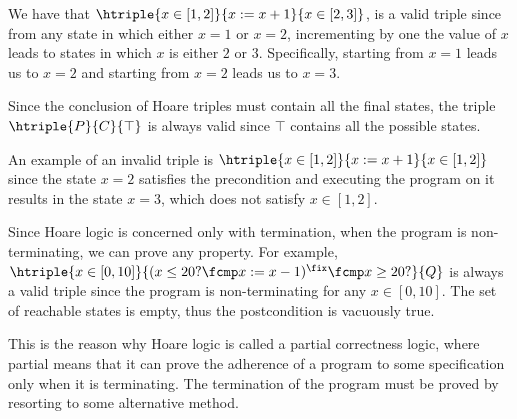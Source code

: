 \begin{example}
  \label{exmp:hlogic}
We have that $\htriple{x \in [1, 2]}{x := x + 1}{x \in [2, 3]}$, is a
valid triple since from any state in which either $x = 1$ or $x = 2$,
incrementing by one the value of $x$ leads to states in which $x$ is either $2$
or $3$. Specifically, starting from $x = 1$ leads us to $x = 2$ and starting
from $x = 2$ leads us to $x = 3$.

Since the conclusion of Hoare triples must contain all the final states, the
triple $\htriple{P}{C}{\top}$ is always valid since $\top$ contains all the
possible states.

An example of an invalid triple is $\htriple{x \in [1, 2]}{x := x
+ 1}{x \in [1, 2]}$ since the state $x = 2$ satisfies the precondition and
executing the program on it results in the state $x = 3$, which does not satisfy
$x \in [1, 2]$.

Since Hoare logic is concerned only with termination, when the program is
non-terminating, we can prove any property. For example, $\htriple{x
\in [0, 10]}{(x \leq 20? \fcmp x := x - 1)^\fix \fcmp x \geq 20?}{Q}$ is always
a valid triple since the program is non-terminating for any $x \in [0, 10]$. 
The set of reachable states is empty, thus the postcondition is vacuously true.

This is the reason why Hoare logic is called a partial correctness logic,
where partial means that it can prove the adherence of a program to
some specification only when it is terminating. The termination of the program
must be proved by resorting to some alternative method.
\end{example}

